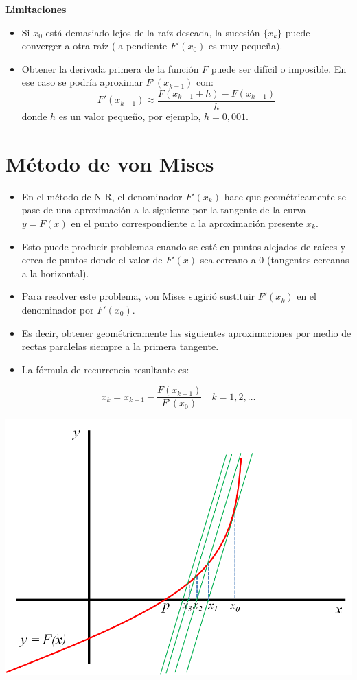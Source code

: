 \documentclass[openany]{book}
\providecommand{\tightlist}{%
  \setlength{\itemsep}{0pt}\setlength{\parskip}{0pt}}
\begin{document}
\textbf{Limitaciones}

\begin{itemize}
\tightlist
\item
  Si \(x_0\) está demasiado lejos de la raíz deseada, la sucesión \(\{x_k\}\) puede converger a otra raíz (la pendiente \(F'(x_0)\) es muy pequeña).
\item
  Obtener la derivada primera de la función \(F\) puede ser difícil o imposible. En ese caso se podría aproximar \(F'(x_{k-1})\) con:
  \[F'(x_{k-1}) \approx \frac{F(x_{k-1} + h) - F(x_{k-1})}{h}\]
  donde \(h\) es un valor pequeño, por ejemplo, \(h = 0,001\).
\end{itemize}

\hypertarget{muxe9todo-de-von-mises}{%
\section{Método de von Mises}\label{muxe9todo-de-von-mises}}

\begin{itemize}
\tightlist
\item
  En el método de N-R, el denominador \(F'(x_k)\) hace que geométricamente se pase de una aproximación a la siguiente por la tangente de la curva \(y = F(x)\) en el punto correspondiente a la aproximación presente \(x_k\).
\item
  Esto puede producir problemas cuando se esté en puntos alejados de raíces y cerca de puntos donde el valor de \(F'(x)\) sea cercano a 0 (tangentes cercanas a la horizontal).
\item
  Para resolver este problema, von Mises sugirió sustituir \(F'(x_k)\) en el denominador por \(F'(x_0)\).
\item
  Es decir, obtener geométricamente las siguientes aproximaciones por medio de rectas paralelas siempre a la primera tangente.
\item
  La fórmula de recurrencia resultante es:
\end{itemize}

\[
x_k = x_{k-1} - \frac{F(x_{k-1})}{F'(x_{0})} \quad k = 1, 2, \dots
\]

\begin{center}\includegraphics[width=0.75\linewidth]{Plots/U2/vonMises} \end{center}
\end{document}
